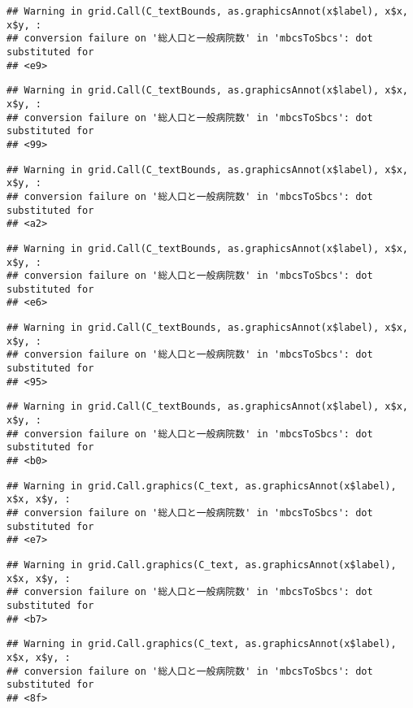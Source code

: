 \documentclass[
]{article}
\begin{document}
\begin{verbatim}
## Warning in grid.Call(C_textBounds, as.graphicsAnnot(x$label), x$x, x$y, :
## conversion failure on '総人口と一般病院数' in 'mbcsToSbcs': dot substituted for
## <e9>
\end{verbatim}

\begin{verbatim}
## Warning in grid.Call(C_textBounds, as.graphicsAnnot(x$label), x$x, x$y, :
## conversion failure on '総人口と一般病院数' in 'mbcsToSbcs': dot substituted for
## <99>
\end{verbatim}

\begin{verbatim}
## Warning in grid.Call(C_textBounds, as.graphicsAnnot(x$label), x$x, x$y, :
## conversion failure on '総人口と一般病院数' in 'mbcsToSbcs': dot substituted for
## <a2>
\end{verbatim}

\begin{verbatim}
## Warning in grid.Call(C_textBounds, as.graphicsAnnot(x$label), x$x, x$y, :
## conversion failure on '総人口と一般病院数' in 'mbcsToSbcs': dot substituted for
## <e6>
\end{verbatim}

\begin{verbatim}
## Warning in grid.Call(C_textBounds, as.graphicsAnnot(x$label), x$x, x$y, :
## conversion failure on '総人口と一般病院数' in 'mbcsToSbcs': dot substituted for
## <95>
\end{verbatim}

\begin{verbatim}
## Warning in grid.Call(C_textBounds, as.graphicsAnnot(x$label), x$x, x$y, :
## conversion failure on '総人口と一般病院数' in 'mbcsToSbcs': dot substituted for
## <b0>
\end{verbatim}

\begin{verbatim}
## Warning in grid.Call.graphics(C_text, as.graphicsAnnot(x$label), x$x, x$y, :
## conversion failure on '総人口と一般病院数' in 'mbcsToSbcs': dot substituted for
## <e7>
\end{verbatim}

\begin{verbatim}
## Warning in grid.Call.graphics(C_text, as.graphicsAnnot(x$label), x$x, x$y, :
## conversion failure on '総人口と一般病院数' in 'mbcsToSbcs': dot substituted for
## <b7>
\end{verbatim}

\begin{verbatim}
## Warning in grid.Call.graphics(C_text, as.graphicsAnnot(x$label), x$x, x$y, :
## conversion failure on '総人口と一般病院数' in 'mbcsToSbcs': dot substituted for
## <8f>
\end{verbatim}
\end{document}
